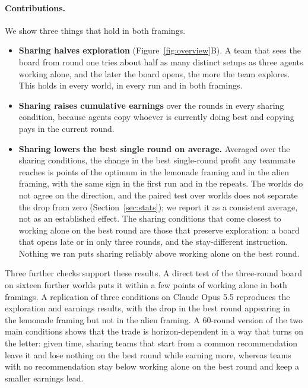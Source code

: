 \paragraph{Contributions.}
We show three things that hold in both framings.
\begin{itemize}[leftmargin=*,itemsep=2pt,topsep=2pt]
  \item \textbf{Sharing halves exploration} (Figure~\ref{fig:overview}B). A team that sees the board from
  round one tries about half as many distinct setups as three agents working alone, and the later the board
  opens, the more the team explores. This holds in every world, in every run and in both framings.
  \item \textbf{Sharing raises cumulative earnings} over the \NRounds{} rounds in every sharing condition,
  because agents copy whoever is currently doing best and copying pays in the current round.
  \item \textbf{Sharing lowers the best single round on average.} Averaged over the sharing conditions, the
  change in the best single-round profit any teammate reaches is \AllLemMax{} points of the optimum in the
  lemonade framing and \AllAliMax{} in the alien framing, with the same sign in the first run and in the
  repeats. The worlds do not agree on the direction, and the paired test over \NWorlds{} worlds does not
  separate the drop from zero (Section~\ref{sec:stats}); we report it as a consistent average, not as an
  established effect. The sharing conditions that come closest to working alone on the best round are those that
  preserve exploration: a board that opens late or in only three rounds, and the stay-different instruction.
  Nothing we ran puts sharing reliably above working alone on the best round.
\end{itemize}
Three further checks support these results. A direct test of the three-round board on sixteen further worlds
puts it within a few points of working alone in both framings. A replication of three conditions on Claude
Opus 5.5 reproduces the exploration and earnings results, with the drop in the best round appearing in the
lemonade framing but not in the alien framing. A 60-round version of the two main conditions shows that the
trade is horizon-dependent in a way that turns on the letter: given time, sharing teams that start from a
common recommendation leave it and lose nothing on the best round while earning more, whereas teams with no
recommendation stay below working alone on the best round and keep a smaller earnings lead.

